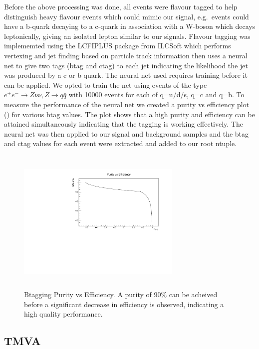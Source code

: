 Before the above processing was done, all events were flavour tagged to help distinguish heavy flavour events which could mimic our signal, e.g.\ events could have a b-quark decaying to a c-quark in association with a W-boson which decays leptonically, giving an isolated lepton similar to our signals. Flavour tagging was implememted using the LCFIPLUS package from ILCSoft which performs vertexing and jet finding based on particle track information then uses a neural net to give two tags (btag and ctag) to each jet indicating the likelihood the jet was produced by a c or b quark. The neural net used requires training before it can be applied. We opted to train the net using events of the type ${e^+e^-\rightarrow Z\nu\nu, Z\rightarrow q\bar{q}}$ with 10000 events for each of q=u/d/s, q=c and q=b. To measure the performance of the neural net we created a purity vs efficiency plot () for various btag values. The plot shows that a high purity and efficiency can be attained simultaneously indicating that the tagging is working effectively. The neural net was then applied to our signal and background samples and the btag and ctag values for each event were extracted and added to our root ntuple.

\begin{figure}
  \centering
  \includegraphics[width=0.70\textwidth,height=7cm,keepaspectratio]{fig/purity}
  \caption[Btagging Purity vs Efficiency]{Btagging Purity vs Efficiency. A purity of 90\% can be acheived before a significant decrease in efficiency is observed, indicating a high quality performance.}
  \label{Fig:purity}
\end{figure}

\subsection{TMVA}

